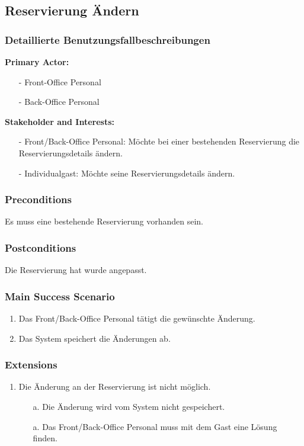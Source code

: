 \documentclass[./detailed_overview_usecases.tex]{subfiles}
\begin{document}
    \subsection{Reservierung Ändern}
    \subsubsection{Detaillierte Benutzungsfallbeschreibungen}
    \textbf{Primary Actor:}
    \begin{itemize}
        \item[-] Front-Office Personal
        \item[-] Back-Office Personal
    \end{itemize}
    \textbf{Stakeholder and Interests:}
    \begin{itemize}
        \item[-] Front/Back-Office Personal: Möchte bei einer bestehenden Reservierung die Reservierungsdetails ändern.
        \item[-] Individualgast: Möchte seine Reservierungsdetails ändern.
    \end{itemize}

    \subsubsection*{Preconditions}
    Es muss eine bestehende Reservierung vorhanden sein.

    \subsubsection*{Postconditions}
    Die Reservierung hat wurde angepasst.

    \subsubsection*{Main Success Scenario}
    \begin{enumerate}
        \item Das Front/Back-Office Personal tätigt die gewünschte Änderung.
        \item Das System speichert die Änderungen ab.
    \end{enumerate}

    \subsubsection*{Extensions}
    \begin{enumerate}
        \item Die Änderung an der Reservierung ist nicht möglich.
        \begin{itemize}
            \item[a.] Die Änderung wird vom System nicht gespeichert.
            \item[a.] Das Front/Back-Office Personal muss mit dem Gast eine Lösung finden.
        \end{itemize}
    \end{enumerate}
\end{document}
